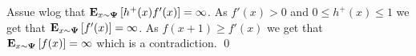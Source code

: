 \documentclass{article}[12pt]
\begin{document}
Assue wlog that ${\bf E}_{x \sim {\bf \Psi}}\left[ h^+(x) f'(x) \right]=\infty$. As
$f'(x)>0$ and $0 \leq h^+(x) \leq 1$ we get that ${\bf E}_{x \sim
  {\bf \Psi}}\left[ f'(x) \right]=\infty$.
As $f(x+1) \geq f'(x)$ we get that $\E{x \sim
  \state}{f(x)}=\infty$ which is a contradiction.
\qed

\iffalse
$\epsilon>0$ such that
for any $v>0$ there exists $|h_v(x)| < v$ such that 
$|\E{x \sim \state}{h_v(x) f'(x)}|>\epsilon$. Define $h'_v =
\frac{h_v}{v}$. Clearly $|h'_v(x)|<1$ and we have that
$$|\E{x \sim \state}{h'_v(x) f'(x)}|>\frac{\epsilon}{v}$$

Define the positive parts of $h_v$ to be $h_v^+(x) = \max(0,h'_v(x))$
and $h_v^-(x) = \max(0,-h'_v(x))$. As $f'(x)>0$ we that either
\[
  \E{x \sim \state}{h^+_v(x) f'(x)}>\frac{\epsilon}{v}
\]
or 
\[
  \E{x \sim \state}{h^-_v(x) f'(x)}>\frac{\epsilon}{v}
\]
Wlog assume the first. As $f \in \SP{2}$, we have that $f(x+1) \geq f'(x)$. Therefore
 $\E{x \sim \state}{f(x+1)|h_v^(x)>0)}=\infty$. As $f(x)>0$ for all $x$ we
 find that $\E{x \sim \state}{f(x)}=\infty$ which contradicts the
 Lemma's assumption.
\qed
\fi
\end{document}
